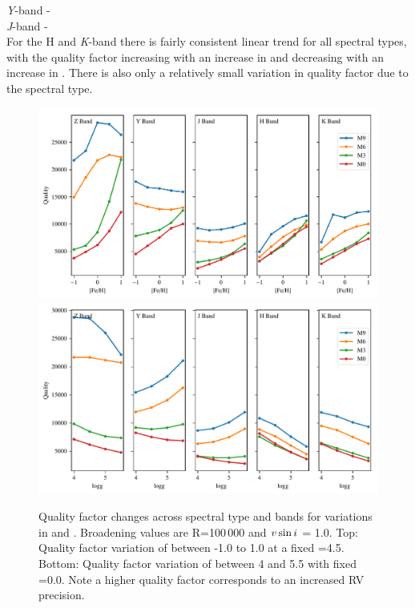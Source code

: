 \emph{Y}-band -\\

\emph{J}-band - \\

For the H and \emph{K}-band there is fairly consistent linear trend for all spectral types, with the quality factor increasing with an increase in \feh{} and decreasing with an increase in \logg{}. There is also only a relatively small variation in quality factor due to the spectral type.



\begin{figure}
\includegraphics[width=0.99\linewidth]{figures/information-content/metalicity_effect.pdf}\\
\includegraphics[width=0.99\linewidth]{figures/information-content/logg_effect.pdf}
\caption{Quality factor changes across spectral type and bands for variations in \feh{} and \logg{}. Broadening values are R=100\,000 and \(v\sin{i}\) = 1.0\kmps{}. Top: Quality factor variation of \feh{} between -1.0 to 1.0 at a fixed \logg{}=4.5. Bottom: Quality factor variation of \logg{} between 4 and 5.5 with fixed \feh{}=0.0. Note a higher quality factor corresponds to an increased {RV} precision.}
\label{fig:deviations}
\end{figure}

